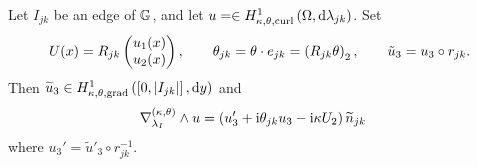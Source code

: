 \begin{cory} \label{cory:TangCurlRotated}
	Let $I_{jk}$ be an edge of $\mathbb{G}$, and let $u=\in H^1_{\kappa,\theta,\mathrm{curl}}\left( \Omega, \mathrm{d}\lambda_{jk} \right)$.
	Set
	\begin{align*}
		U(x) = R_{jk} \begin{pmatrix} u_1(x) \\ u_2(x) \end{pmatrix}, 
		\qquad \theta_{jk} = \theta\cdot e_{jk} = \left(  R_{jk}\theta  \right)_2,
		\qquad \tilde{u}_3 = u_3 \circ r_{jk}.
	\end{align*}
	Then $\widetilde{u}_3\in H^1_{\kappa,\theta,\mathrm{grad}}\left( \left[ 0,\left\lvert I_{jk} \right\rvert \right], \mathrm{d}y \right)$ and 
	\begin{align*}
		\nabla_{\lambda_I}^{\left( \kappa, \theta \right)}\wedge u &= \left(  u_3' + \mathrm{i}\theta_{jk}u_3 - \mathrm{i}\kappa U_2  \right)\widetilde{n}_{jk}
	\end{align*}
	where $u_3' = \widetilde{u}'_3 \circ r_{jk}^{-1}$.
\end{cory}
